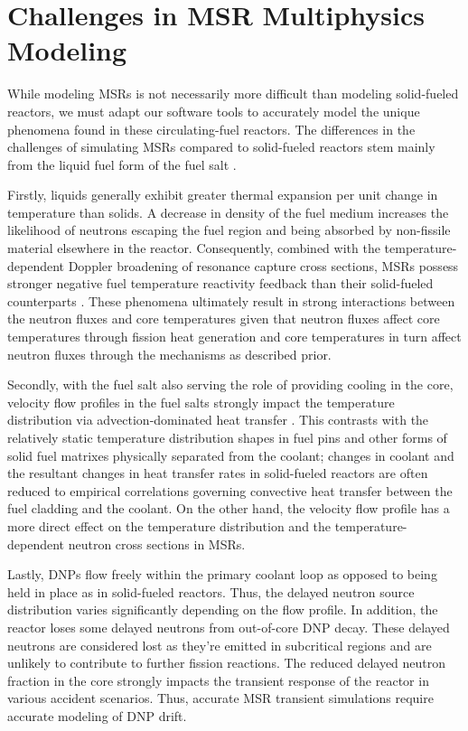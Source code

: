 \section{Challenges in \gls{MSR} Multiphysics Modeling} \label{sec:challenges}

While modeling \glspl{MSR} is not necessarily more difficult than modeling
solid-fueled reactors, we must adapt our software tools to accurately model the
unique phenomena found in these circulating-fuel reactors. The differences in
the challenges of simulating \glspl{MSR} compared to solid-fueled reactors stem
mainly from the liquid fuel form of the fuel salt \cite{huff_identifying_2019,
diamond_phenomena_2018}.

Firstly, liquids generally exhibit greater thermal
expansion per unit change in temperature than solids. A decrease in density of
the fuel medium increases the likelihood of neutrons escaping the fuel region
and being absorbed by non-fissile material elsewhere in the reactor.
Consequently, combined with the temperature-dependent Doppler broadening of
resonance capture cross sections, \glspl{MSR} possess stronger negative fuel
temperature reactivity feedback than their solid-fueled counterparts
\cite{elsheikh_safety_2013}. These
phenomena ultimately result in strong interactions between the neutron fluxes
and core temperatures given that neutron fluxes affect core temperatures
through fission heat generation and core temperatures in turn affect neutron
fluxes through the mechanisms as described prior.

Secondly, with the fuel
salt also serving the role of providing cooling in the core, velocity flow
profiles in the fuel salts strongly impact the temperature distribution via
advection-dominated heat transfer \cite{diamond_phenomena_2018}. This contrasts
with the relatively static temperature distribution shapes in fuel pins and
other forms of solid fuel matrixes physically separated from the coolant; 
changes in coolant and the resultant changes in heat transfer rates in
solid-fueled reactors are often reduced to empirical correlations governing
convective heat transfer between the fuel cladding and the coolant. On the
other hand, the velocity flow profile has a more direct effect on the
temperature distribution and the temperature-dependent neutron cross sections
in \glspl{MSR}.

Lastly, \glspl{DNP} flow freely within the primary coolant loop as opposed to
being held in place as in solid-fueled reactors. Thus, the delayed neutron
source distribution varies significantly depending on the flow profile. In
addition,
the reactor loses some delayed neutrons from out-of-core \gls{DNP} decay. These
delayed neutrons are considered lost as they're emitted in subcritical regions
and are unlikely to contribute to further fission reactions. The reduced
delayed neutron fraction in the core strongly impacts the transient response of
the reactor in various accident scenarios. Thus, accurate \gls{MSR} transient
simulations require accurate modeling of \gls{DNP} drift.

